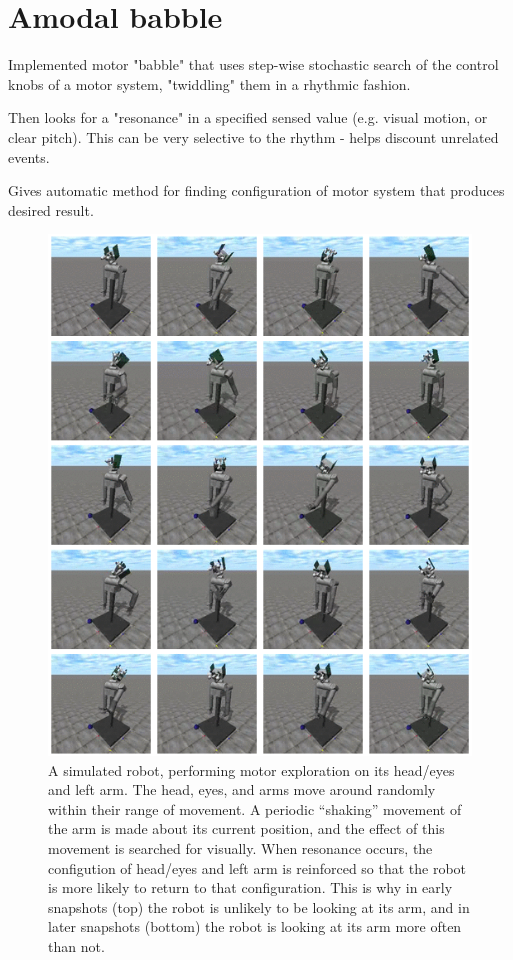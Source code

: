 
\section{Amodal babble}

Implemented motor "babble" that uses step-wise stochastic search of the control knobs of a motor system, "twiddling" them in a rhythmic fashion.

Then looks for a "resonance" in a specified sensed value (e.g. visual motion, or clear pitch).  This can be very selective to the rhythm - helps discount unrelated events.

Gives automatic method for finding configuration of motor system that produces desired result.


\begin{figure}[p]
\centerline{\includegraphics[width=\textwidth]{images/find-arm}}
\caption{
%
A simulated robot, performing motor exploration on its
head/eyes and left arm.  The head, eyes, and arms move around randomly
within their range of movement.
%
A periodic ``shaking'' movement of the arm is made about its
current position, and the effect of this movement is searched 
for visually.
%
When resonance occurs, the configution of head/eyes and left arm
is reinforced so that the robot is more likely to return to that
configuration.
%
This is why 
in early snapshots (top) the robot is unlikely to be looking at 
its arm, and in later snapshots (bottom) the robot is looking at
its arm more often than not.
%
}
\end{figure}

